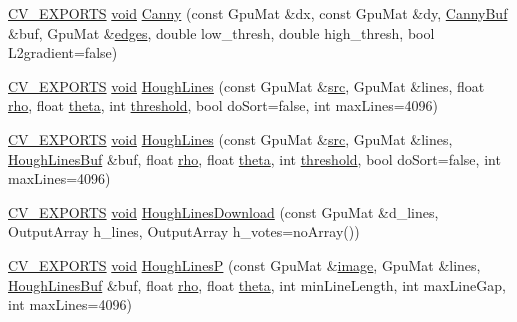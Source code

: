 \begin{DoxyCompactItemize}
\item 
\hyperlink{core_2types__c_8h_a1bf9f0e121b54272da02379cfccd0a2b}{C\-V\-\_\-\-E\-X\-P\-O\-R\-T\-S} \hyperlink{legacy_8hpp_a8bb47f092d473522721002c86c13b94e}{void} \hyperlink{namespacecv_1_1gpu_ac1c558514399b043053da1292c0cf8c7}{Canny} (const Gpu\-Mat \&dx, const Gpu\-Mat \&dy, \hyperlink{structcv_1_1gpu_1_1CannyBuf}{Canny\-Buf} \&buf, Gpu\-Mat \&\hyperlink{imgproc__c_8h_a0934986249e7ba69309a154af3260f89}{edges}, double low\-\_\-thresh, double high\-\_\-thresh, bool L2gradient=false)
\item 
\hyperlink{core_2types__c_8h_a1bf9f0e121b54272da02379cfccd0a2b}{C\-V\-\_\-\-E\-X\-P\-O\-R\-T\-S} \hyperlink{legacy_8hpp_a8bb47f092d473522721002c86c13b94e}{void} \hyperlink{namespacecv_1_1gpu_a0a4b78050f189b5b7d8c429ab2c22ae5}{Hough\-Lines} (const Gpu\-Mat \&\hyperlink{legacy_8hpp_a371cd109b74033bc4366f584edd3dacc}{src}, Gpu\-Mat \&lines, float \hyperlink{imgproc__c_8h_a7d8783b6b909806d38134f1f342005bf}{rho}, float \hyperlink{imgproc__c_8h_a90ba48f41646a904a861746079d43f17}{theta}, int \hyperlink{namespacecv_1_1gpu_a63944c7054df081596be6b4cf94df871}{threshold}, bool do\-Sort=false, int max\-Lines=4096)
\item 
\hyperlink{core_2types__c_8h_a1bf9f0e121b54272da02379cfccd0a2b}{C\-V\-\_\-\-E\-X\-P\-O\-R\-T\-S} \hyperlink{legacy_8hpp_a8bb47f092d473522721002c86c13b94e}{void} \hyperlink{namespacecv_1_1gpu_ad2945b365a39a40a15551a362643f128}{Hough\-Lines} (const Gpu\-Mat \&\hyperlink{legacy_8hpp_a371cd109b74033bc4366f584edd3dacc}{src}, Gpu\-Mat \&lines, \hyperlink{structcv_1_1gpu_1_1HoughLinesBuf}{Hough\-Lines\-Buf} \&buf, float \hyperlink{imgproc__c_8h_a7d8783b6b909806d38134f1f342005bf}{rho}, float \hyperlink{imgproc__c_8h_a90ba48f41646a904a861746079d43f17}{theta}, int \hyperlink{namespacecv_1_1gpu_a63944c7054df081596be6b4cf94df871}{threshold}, bool do\-Sort=false, int max\-Lines=4096)
\item 
\hyperlink{core_2types__c_8h_a1bf9f0e121b54272da02379cfccd0a2b}{C\-V\-\_\-\-E\-X\-P\-O\-R\-T\-S} \hyperlink{legacy_8hpp_a8bb47f092d473522721002c86c13b94e}{void} \hyperlink{namespacecv_1_1gpu_ab7c3d1403318e4fcd3d3efbe0b3957c2}{Hough\-Lines\-Download} (const Gpu\-Mat \&d\-\_\-lines, Output\-Array h\-\_\-lines, Output\-Array h\-\_\-votes=no\-Array())
\item 
\hyperlink{core_2types__c_8h_a1bf9f0e121b54272da02379cfccd0a2b}{C\-V\-\_\-\-E\-X\-P\-O\-R\-T\-S} \hyperlink{legacy_8hpp_a8bb47f092d473522721002c86c13b94e}{void} \hyperlink{namespacecv_1_1gpu_a94fcaa555cdabc3d9e1af53c828c5c5f}{Hough\-Lines\-P} (const Gpu\-Mat \&\hyperlink{legacy_8hpp_ad62b16ab219ae2483e8a3d921c44cc97}{image}, Gpu\-Mat \&lines, \hyperlink{structcv_1_1gpu_1_1HoughLinesBuf}{Hough\-Lines\-Buf} \&buf, float \hyperlink{imgproc__c_8h_a7d8783b6b909806d38134f1f342005bf}{rho}, float \hyperlink{imgproc__c_8h_a90ba48f41646a904a861746079d43f17}{theta}, int min\-Line\-Length, int max\-Line\-Gap, int max\-Lines=4096)

\end{DoxyCompactItemize}
